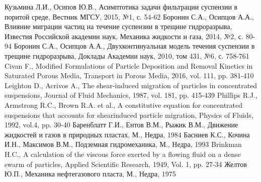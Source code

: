 \begin{thebibliography}{99}
Кузьмина Л.И., Осипов Ю.В.,
Асимптотика задачи фильтрации суспензии в поритой среде,
Вестник МГСУ, 2015, №1, с. 54-62
Боронин С.А., Осипцов А.А.,
Влияние миграции частиц на течение суспензии в трещине гидроразрыва,
Известия Российской академии наук, Механика жидкости и газа, 2014, №2, с. 80-94
Боронин С.А., Осипцов А.А.,
Двухконтинуальная модель течения суспензии в трещине гидроразрыва,
Доклады Академии наук, 2010, том 431, №6, с. 758-761
Civan F.,
Modified Formulations of Particle Deposition and Removal Kinetics in Saturated Porous Media,
Transport in Porous Media, 2016, vol. 111, pp. 381-410
Leighton D., Acrivos A.,
The shear-induced migration of particles in concentrated suspensions,
Journal of Fluid Mechanics, 1987, vol. 181, pp. 415-439
Phillips R.J., Armstrong R.C., Brown R.A. et al.,
A constitutive equation for concentrated suspensions that accounts for shearinduced particle migration,
Physics of Fluids, 1992, vol.4, pp. 30-40
Баренблатт Г.И., Ентов В.М., Рыжик В.М.,
Движение жидкостей и газов в природных пластах, М., 
Недра, 1984
Басниев К.С., Кочина И.Н., Максимов В.М.,
Подземная гидромеханика, М., 
Недра, 1993
Brinkman H.C.,
A calculation of the viscous force exerted by a flowing fluid on a dense swarm of particles,
Applied Scientific Research, 1949, Vol. 1, pp. 27-34
Желтов Ю.П.,
Механика нефтегазового пласта,
М., Недра, 1975

\end{thebibliography}